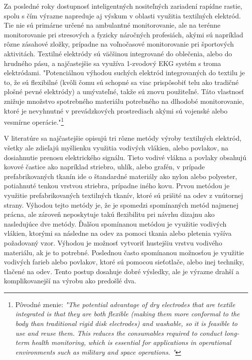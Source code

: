 Za posledné roky dostupnosť inteligentných nositeľných zariadení rapídne rastie, spolu s čím výrazne napreduje aj výskum v oblasti využitia textilných elektród. Tie nie sú primárne určené na ambulantné monitorovanie, ale na terénne monitorovanie pri stresových a fyzicky náročných profesiách, akými sú napríklad rôzne zásahové zložky, prípadne na voľnočasové monitorovanie pri športových aktivitách. Textilné elektródy sú väčšinou integrované do oblečenia, alebo do hrudného pásu, a najčastejšie sa využíva 1-zvodový EKG systém s troma elektródami.\cite{Thakor1980} "Potenciálnou výhodou suchých elektród integrovaných do textilu je to, že sú flexibilné (kvôli čomu sú schopné sa viac prispôsobiť telu ako tradičné plošné pevné elektródy) a umývateľné, takže sú znovu použiteľné. Táto vlastnosť znižuje množstvo spotrebného materiálu potrebného na dlhodobé monitorovanie, ktoré je nevyhnutné v prevádzkových prostrediach akými sú vojenské alebo vesmírne operácie."\footnote{Pôvodné znenie: \textit{"The potential advantage of dry electrodes that are textile integrated is that they are both flexible (making them more conformal to the body than traditional rigid disk electrodes) and washable, so it is feasible to use and reuse them. This reduces the consumables required to conduct long-term health monitoring, which is essential for applications in operational environments such as military and space operations. "}}\cite{Arquilla2020}

V literatúre sa najčastejšie opisujú tri rôzne metódy výroby textilných elektród, všetky ale zdieľajú myšlienku využitia vodivých vlákien, alebo povlakov, na dosiahnutie prenosu elektrického signálu. Tieto vodivé vlákna a povlaky obsahujú kovové častice ako napríklad striebro, uhlík, alebo grafén, v prípade prefabrikovaných tkanín ide o štandardné materiály ako nylon alebo polyester, potiahnuté tenkou vrstvou striebra, prípadne iného kovu.\cite{Pani2018} Prvou metódou je využitie prefabrikovaných textilných tkanív, ktoré sú prišité na odev z vnútornej strany.\cite{Vojtech2013} Výhodou tejto metódy je, že je spomedzi spomínaných metód najmenej prácna, ale zároveň neposkytuje takú flexibilitu pri návrhu dizajnu ako nasledujúce dve metódy. Ďalšou spomínanou metódou je využitie vodivých vlákien, ktorými sa následne na odev za pomoci tkania alebo pletenia vyšíva požadovaný vzor.\cite{Marozas2011}\cite{Fobelets2023} Výhodou je možnosť vytvoriť hustejšiu vrstvu vodivého materiálu, ak je to potrebné.\cite{Arquilla2020} Poslednou často spomínanou možnosťou je využitie vodivých farieb alebo povlakov, ktoré sú pomocou sieťotlače, alebo inej techniky, tlačené na odev. Tento postup dosahuje dobré výsledky, ale je výrazne drahší a komplikovanejší na výrobu ako predošlé dva.\cite{Xu2020}\cite{Paul2015}

